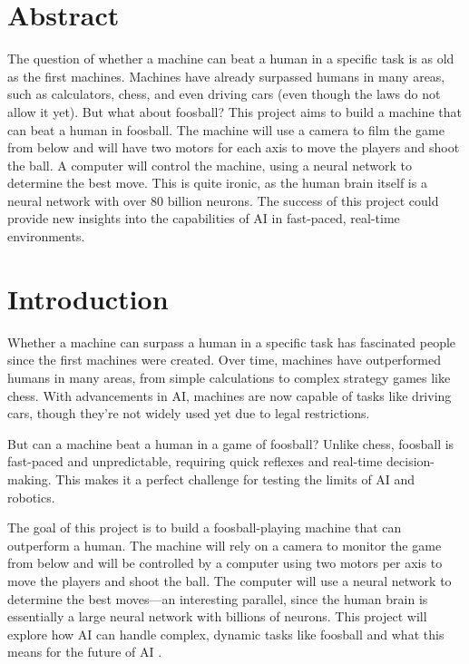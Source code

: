 \section{Abstract}\label{sec:abstract}
The question of whether a machine can beat a human in a specific task is as old as the first machines.
Machines have already surpassed humans in many areas, such as calculators, chess, and even driving cars (even though the laws do not allow it yet).
But what about foosball?
This project aims to build a machine that can beat a human in foosball.
The machine will use a camera to film the game from below and will have two motors for each axis to move the players and shoot the ball.
A computer will control the machine, using a neural network to determine the best move.
This is quite ironic, as the human brain itself is a neural network with over 80 billion neurons.
The success of this project could provide new insights into the capabilities of AI in fast-paced, real-time environments.


\section{Introduction}\label{sec:introduction}

Whether a machine can surpass a human in a specific task has fascinated people since the first machines were created.
Over time, machines have outperformed humans in many areas, from simple calculations to complex strategy games like chess.
With advancements in AI, machines are now capable of tasks like driving cars, though they’re not widely used yet due to legal restrictions.

But can a machine beat a human in a game of foosball?
Unlike chess, foosball is fast-paced and unpredictable, requiring quick reflexes and real-time decision-making.
This makes it a perfect challenge for testing the limits of AI and robotics.

The goal of this project is to build a foosball-playing machine that can outperform a human.
The machine will rely on a camera to monitor the game from below and will be controlled by a computer using two motors per axis to move the players and shoot the ball.
The computer will use a neural network to determine the best moves—an interesting parallel, since the human brain is essentially a large neural network with billions of neurons.
This project will explore how AI can handle complex, dynamic tasks like foosball and what this means for the future of AI .


